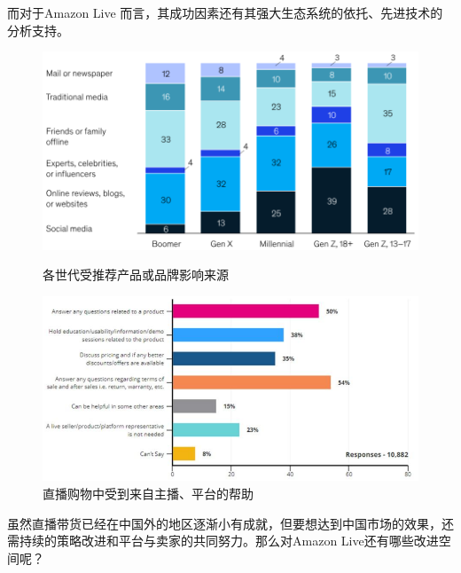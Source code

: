 \documentclass[12pt]{ctexart}
\begin{document}
而对于Amazon Live 而言，其成功因素还有其强大生态系统的依托、先进技术的分析支持。

\begin{figure}[htbp!]
    \begin{minipage}[t]{0.47\textwidth}
        \centering
        \includegraphics[width=\textwidth]{Images/7.png}
        \caption{各世代受推荐产品或品牌影响来源\cite{10}}
        \label{global}
    \end{minipage}
    \hfill
    \begin{minipage}[t]{0.505\textwidth}
        \centering
        \includegraphics[width=\textwidth]{Images/8.png}
        \caption{直播购物中受到来自主播、平台的帮助 \cite{20}}
        \label{region}
    \end{minipage}
\end{figure}

虽然直播带货已经在中国外的地区逐渐小有成就，但要想达到中国市场的效果，还需持续的策略改进和平台与卖家的共同努力。那么对Amazon Live还有哪些改进空间呢？
\end{document}
